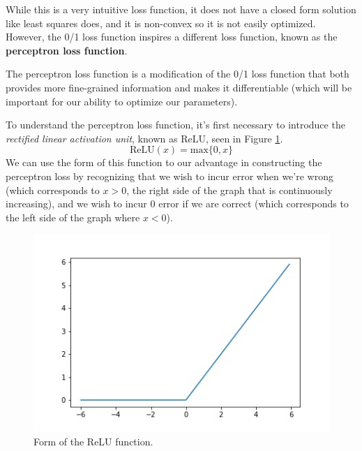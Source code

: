 While this is a very intuitive loss function, it does not have a closed form solution like least squares does, and it is non-convex so it is not easily optimized. However, the 0/1 loss function inspires a different loss function, known as the \textbf{perceptron loss function}.

The perceptron loss function is a modification of the 0/1 loss function that both provides more fine-grained information and makes it differentiable (which will be important for our ability to optimize our parameters).

To understand the perceptron loss function, it's first necessary to introduce the \textit{rectified linear activation unit}, known as ReLU, seen in Figure \ref{fig:relu-fn}.
\begin{equation}
	\text{ReLU}(x) = \text{max}\{0, x\}
\end{equation}
We can use the form of this function to our advantage in constructing the perceptron loss by recognizing that we wish to incur error when we're wrong (which corresponds to $x > 0$, the right side of the graph that is continuously increasing), and we wish to incur 0 error if we are correct (which corresponds to the left side of the graph where $x < 0$).
\begin{figure}
    \centering
    \includegraphics[width=0.5\paperwidth]{../Classification/fig/relu_fn_GEN.jpg}
    \caption{Form of the ReLU function.}
    \label{fig:relu-fn}
\end{figure}

